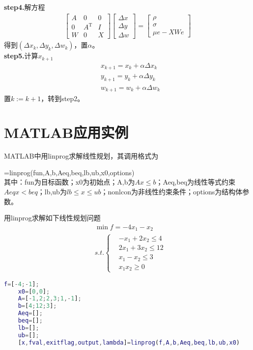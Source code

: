         \textbf{step4.}解方程
        \begin{align*}
        \begin{bmatrix} A & 0 & 0\\
        0 & A^\mathrm{T} & I\\ W & 0 & X \end{bmatrix}\begin{bmatrix}\Delta x\\\Delta y\\\Delta w \end{bmatrix}=\begin{bmatrix}\rho \\ \sigma \\\mu e-XWe\end{bmatrix}
        \end{align*}
        得到$(\Delta x_k,\Delta y_k,\Delta w_k)$，置$\alpha$。\\
        \textbf{step5.}计算$x_{k+1}$
        \begin{align*}
        &x_{k+1}=x_k+{\alpha}\Delta x_k \\
        &y_{k+1}=y_k+{\alpha}\Delta y_k\\
        &w_{k+1} =w_k+{\alpha}\Delta w_k
        \end{align*}
        置$k:=k+1$，转到step2。
\section{MATLAB应用实例}
    \par
    MATLAB中用linprog求解线性规划，其调用格式为
    \par
    [x,fval,exitflag,output]=linprog(fun,A,b,Aeq,beq,lb,ub,x0,options)\\
    其中：fun为目标函数；x0为初始点；A,b为$Ax \leqslant b$；Aeq,beq为线性等式约束$Aeq{}x < beq$；lb,ub为$lb \leqslant x \leqslant ub$；nonlcon为非线性约束条件；options为结构体参数。
    \par
    用linprog求解如下线性规划问题
    \begin{align*}
    &\mathop {\min} f=-4x_1-x_2\\
    &s.t.\left\{
    \begin{aligned}
    &-x_1+2x_2 \leqslant 4\\
    &2x_1+3x_2 \leqslant 12\\
    &x_1-x_2 \leqslant 3\\
    &x_1x_2 \geqslant 0
    \end{aligned}
    \right.
    \end{align*}
    \begin{lstlisting}[language=Matlab]
    f=[-4;-1];
    x0=[0,0];
    A=[-1,2;2,3;1,-1];
    b=[4;12;3];
    Aeq=[];
    beq=[];
    lb=[];
    ub=[];
    [x,fval,exitflag,output,lambda]=linprog(f,A,b,Aeq,beq,lb,ub,x0)
    \end{lstlisting}

